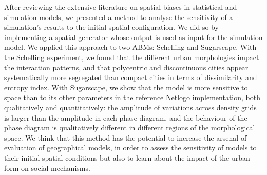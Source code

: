 \documentclass[preprint,5p,times,twocolumn,authoryear]{elsarticle}
\begin{document}
After reviewing the extensive literature on spatial biases in statistical and simulation models, we presented a method to analyse the sensitivity of a simulation's results to the initial spatial configuration. We did so by implementing a spatial generator whose output is used as input for the simulation model. We applied this approach to two  ABMs: Schelling and Sugarscape. With the Schelling experiment, we found that the different urban morphologies impact the interaction patterns, and that polycentric and discontinuous cities appear systematically more segregated than compact cities in terms of dissimilarity and entropy index. With Sugarscape, we show that the model is more sensitive to space than to its other parameters in the reference Netlogo implementation, both qualitatively and quantitatively: the amplitude of variations across density grids is larger than the amplitude in each phase diagram, and the behaviour of the phase diagram is qualitatively different in different regions of the morphological space. We think that this method has the potential to increase the arsenal of evaluation of geographical models, in order to assess the sensitivity of models to their initial spatial conditions but also to learn about the impact of the urban form on social mechanisms.








\appendix

\section{}

\end{document}
